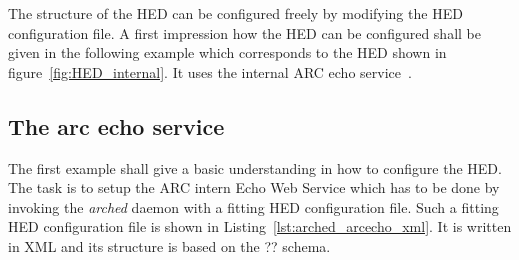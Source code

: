 The structure of the HED can be configured freely by modifying the HED configuration file. A first impression how the HED can be configured shall be given in the following example which corresponds to the HED shown in figure~\ref{fig:HED_internal}. It uses the internal ARC echo service~\cite{QIANG_2005}.


\subsection{The arc echo service}

The first example shall give a basic understanding in how to configure the HED. The task is to setup the ARC intern Echo Web Service which has to be done by invoking the \textit{arched} daemon with a fitting HED configuration file. Such a fitting HED configuration file is shown in Listing~\ref{lst:arched_arcecho_xml}. It is written in XML and its structure is based on the \textcolor{urgent}{??} schema.
\\

